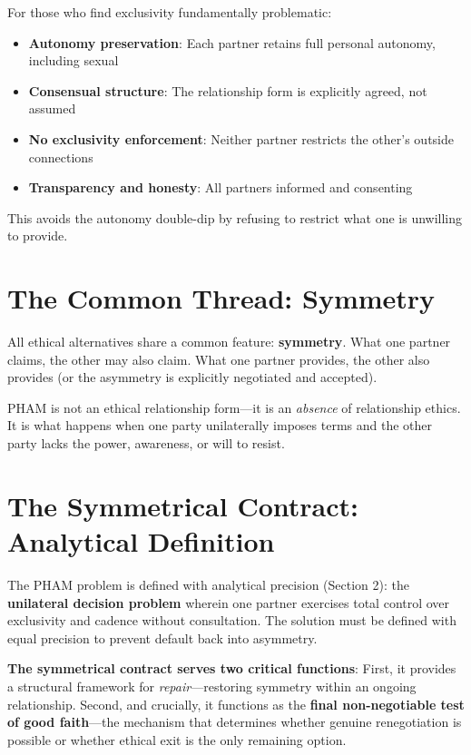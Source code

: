 \documentclass[12pt,openany]{book}
\numberwithin{equation}{chapter}
\begin{document}
For those who find exclusivity fundamentally problematic:

\begin{itemize}
    \item \textbf{Autonomy preservation}: Each partner retains full personal autonomy, including sexual
    \item \textbf{Consensual structure}: The relationship form is explicitly agreed, not assumed
    \item \textbf{No exclusivity enforcement}: Neither partner restricts the other's outside connections
    \item \textbf{Transparency and honesty}: All partners informed and consenting
\end{itemize}

This avoids the autonomy double-dip by refusing to restrict what one is unwilling to provide.

\section{The Common Thread: Symmetry}

All ethical alternatives share a common feature: \textbf{symmetry}. What one partner claims, the other may also claim. What one partner provides, the other also provides (or the asymmetry is explicitly negotiated and accepted).

PHAM is not an ethical relationship form---it is an \textit{absence} of relationship ethics. It is what happens when one party unilaterally imposes terms and the other party lacks the power, awareness, or will to resist.

\section{The Symmetrical Contract: Analytical Definition}

The PHAM problem is defined with analytical precision (Section 2): the \textbf{unilateral decision problem} wherein one partner exercises total control over exclusivity and cadence without consultation. The solution must be defined with equal precision to prevent default back into asymmetry.

\textbf{The symmetrical contract serves two critical functions}: First, it provides a structural framework for \textit{repair}---restoring symmetry within an ongoing relationship. Second, and crucially, it functions as the \textbf{final non-negotiable test of good faith}---the mechanism that determines whether genuine renegotiation is possible or whether ethical exit is the only remaining option.
\end{document}
